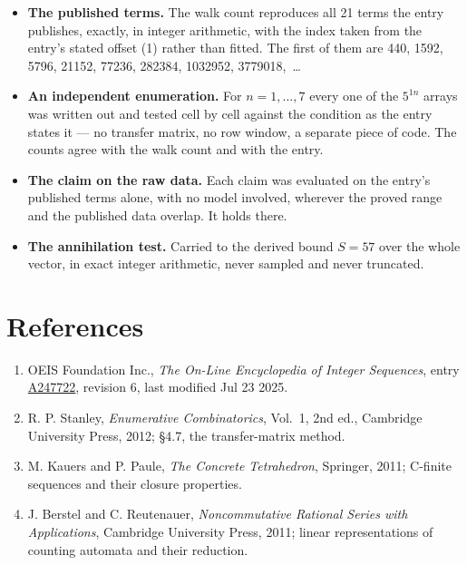 \documentclass[11pt]{article}
\theoremstyle{definition}
\begin{document}
\begin{itemize}

\item {\bfseries The published terms.} The walk count reproduces all 21 terms the entry publishes, exactly, in integer arithmetic, with the index taken from the entry's stated offset (1) rather than fitted. The first of them are 440, 1592, 5796, 21152, 77236, 282384, 1032952, 3779018,~\dots

\item {\bfseries An independent enumeration.} For $n = 1,\dots,7$ every one of the $5^{1n}$ arrays was written out and tested cell by cell against the condition as the entry states it --- no transfer matrix, no row window, a separate piece of code. The counts agree with the walk count and with the entry.

\item {\bfseries The claim on the raw data.} Each claim was evaluated on the entry's published terms alone, with no model involved, wherever the proved range and the published data overlap. It holds there.

\item {\bfseries The annihilation test.} Carried to the derived bound $S = 57$ over the whole vector, in exact integer arithmetic, never sampled and never truncated.

\end{itemize}

\section{References}

\begin{enumerate}

\item OEIS Foundation Inc., \emph{The On-Line Encyclopedia of Integer Sequences}, entry \href{https://oeis.org/A247722}{A247722}, revision 6, last modified Jul 23 2025.

\item R. P. Stanley, \emph{Enumerative Combinatorics}, Vol.~1, 2nd ed., Cambridge University Press, 2012; \S4.7, the transfer-matrix method.

\item M. Kauers and P. Paule, \emph{The Concrete Tetrahedron}, Springer, 2011; C-finite sequences and their closure properties.

\item J. Berstel and C. Reutenauer, \emph{Noncommutative Rational Series with Applications}, Cambridge University Press, 2011; linear representations of counting automata and their reduction.

\end{enumerate}
\end{document}
